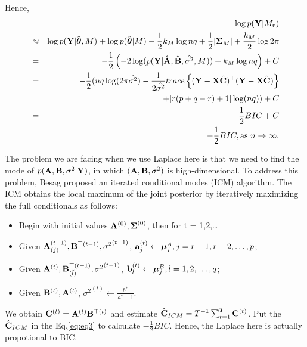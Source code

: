 \documentclass[]{book}
\providecommand{\tightlist}{%
  \setlength{\itemsep}{0pt}\setlength{\parskip}{0pt}}
\begin{document}
Hence,
\begin{eqnarray}
&&\log p({\bf Y}|M_r) \nonumber\\ 
&\approx& \log p({\bf Y}|\hat{{\boldsymbol \theta}},M) + \log p(\hat{\boldsymbol \theta}|M) -\frac{1}{2}k_M\log nq +\frac{1}{2}|{\boldsymbol \Sigma}_M|
+ \frac{k_M}{2}\log 2\pi\nonumber\\
&=&-\frac{1}{2} \left(-2\log(p({\bf Y}|\hat{{\bf A}},\hat{{\bf B}},\hat{\sigma^2},M)) + k_M \log nq\right)  +C\nonumber\\
&=&-\frac{1}{2}(nq\log(2\pi\hat{\sigma^2})-
\frac{1}{2\hat{\sigma^2}} trace\left\{({\bf Y}-{\bf X}\hat{\bf C})^{{\top}}({\bf Y}-{\bf X}\hat{\bf C}) \right\} \nonumber\\
&&+ [r(p+q-r)+1] \log(nq))+C\nonumber\\
&=& -\frac{1}{2}BIC + C\nonumber\\
&=& -\frac{1}{2}BIC, \text{as } n\rightarrow \infty.
\label{eq:eq3}
\end{eqnarray}

The problem we are facing when we use Laplace here is that we need to find the mode of \(p({\bf A},{\bf B},\sigma^2|{\bf Y})\), in which \(({\bf A},{\bf B},\sigma^2)\) is high-dimensional. To address this problem, Besag proposed an iterated conditional modes (ICM) algorithm. The ICM obtains the local maximum of the joint posterior by iteratively maximizing the full conditionals as follows:

\begin{itemize}
\tightlist
\item
  Begin with initial values \({\bf A}^{(0)},{\boldsymbol \Sigma}^{(0)}\), then for t = 1,2,\ldots{}
\item
  Given \({\bf A}_{(j)}^{(t-1)},{\bf B}^{{\top}(t-1)}, {\sigma^2}^{(t-1)}\), \({\bf a}_j^{(t)}\leftarrow{\boldsymbol \mu}_j^A,j=r+1,r+2,\ldots,p\);
\item
  Given \({\bf A}^{(t)},{\bf B}^{{\top}(t-1)}_{(\tilde{l})}, {\sigma^2}^{(t-1)}\), \({\bf b}_l^{(t)}\leftarrow{\boldsymbol \mu}_j^B,l=1,2,\ldots,q\);
\item
  Given \({\bf B}^{(t)}, {\bf A}^{(t)}\), \({\sigma^2}^{(t)}\leftarrow\frac{b^*}{a^*-1}\).
\end{itemize}

We obtain \({\bf C}^{(t)}={\bf A}^{(t)}{\bf B}^{{\top}(t)}\) and estimate \(\hat{{\bf C}}_{ICM}=T^{-1}\sum_{t=1}^{T}{\bf C}^{(t)}\). Put the \(\hat{{\bf C}}_{ICM}\) in the Eq.\eqref{eq:eq3} to calculate \(-\frac{1}{2}BIC\). Hence, the Laplace here is actually propotional to BIC.
\end{document}
